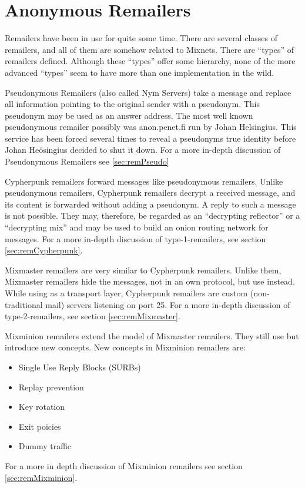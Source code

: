 \section{Anonymous Remailers\label{sec:remailers}}
Remailers have been in use for quite some time. There are several classes of remailers, and all of them are somehow related to Mixnets. There are ``types'' of remailers defined. Although these ``types'' offer some hierarchy, none of the more advanced ``types'' seem to have more than one implementation in the wild. 

Pseudonymous Remailers (also called Nym Servers) take a message and replace all information pointing to the original sender with a pseudonym. This pseudonym may be used as an answer address. The most well known pseudonymous remailer possibly was anon.penet.fi run by Johan Helsingius. This service has been forced several times to reveal a pseudonyms true identity before Johan Heösingius decided to shut it down. For a more in-depth discussion of Pseudonymous Remailers see \ref{sec:remPseudo}

Cypherpunk remailers forward messages like pseudonymous remailers. Unlike pseudonymous remailers, Cypherpunk remailers decrypt a received message, and its content is forwarded without adding a pseudonym. A reply to such a message is not possible. They may, therefore, be regarded as an ``decrypting reflector'' or a ``decrypting mix'' and may be used to build an onion routing network for messages. For a more in-depth discussion of type-1-remailers, see section  \ref{sec:remCypherpunk}.

Mixmaster remailers are very similar to Cypherpunk remailers. Unlike them, Mixmaster remailers hide the messages, not in an own protocol, but use  instead. While using  as a transport layer, Cypherpunk remailers are custom (non-traditional mail) servers listening on port 25. For a more in-depth discussion of type-2-remailers, see section \ref{sec:remMixmaster}.

Mixminion remailers extend the model of Mixmaster remailers. They still use  but introduce new concepts. New concepts in Mixminion remailers are:
\begin{itemize}
	\item Single Use Reply Blocks (SURBs)
	\item Replay prevention
	\item Key rotation
	\item Exit poicies
	\item Dummy traffic
\end{itemize}
For a more in depth discussion of Mixminion remailers see section \ref{sec:remMixminion}.


